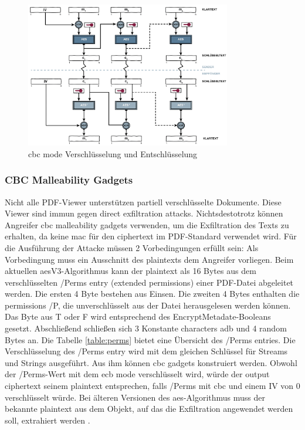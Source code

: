 \begin{figure}[!htbp]
	\centering
	\includegraphics[width=0.8\textwidth]{"images/cbc.png"}
	\caption{\gls{cbc} mode Verschlüsselung und Entschlüsselung \cite{cbc}}
	\label{fig:cbc}
\end{figure}

\subsubsection{CBC Malleability Gadgets}
Nicht alle PDF-Viewer unterstützen partiell verschlüsselte Dokumente. Diese Viewer sind immun gegen direct exfiltration attacks. Nichtsdestotrotz können Angreifer \gls{cbc} malleability gadgets verwenden, um die Exfiltration des Texts zu erhalten, da keine \gls{mac} für den ciphertext im PDF-Standard verwendet wird. Für die Ausführung der Attacke müssen 2 Vorbedingungen erfüllt sein: Als Vorbedingung muss ein Ausschnitt des plaintexts dem Angreifer vorliegen. Beim aktuellen \gls{aes}V3-Algorithmus kann der plaintext als 16 Bytes aus dem verschlüsselten /Perms entry (extended permissions) einer PDF-Datei abgeleitet werden. Die ersten 4 Byte bestehen aus Einsen. Die zweiten 4 Bytes enthalten die permissions /P, die unverschlüsselt aus der Datei herausgelesen werden können. Das Byte aus T oder F wird entsprechend des EncryptMetadate-Booleans gesetzt. Abschließend schließen sich 3 Konstante characters adb und 4 random Bytes an. Die Tabelle \ref{table:perms} bietet eine Übersicht des /Perms entries. Die Verschlüsselung des /Perms entry wird mit dem gleichen Schlüssel für Streams und Strings ausgeführt. Aus ihm können \gls{cbc} gadgets konstruiert werden. Obwohl der /Perms-Wert mit dem \gls{ecb} mode verschlüsselt wird, würde der output ciphertext seinem plaintext entsprechen, falls /Perms mit \gls{cbc} und einem IV von 0 verschlüsselt würde. Bei älteren Versionen des \gls{aes}-Algorithmus muss der bekannte plaintext aus dem Objekt, auf das die Exfiltration angewendet werden soll, extrahiert werden \cite{ccc-break-pdf, pdfex}.

